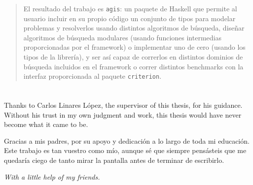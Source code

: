 \begin{abstract}
El resultado del trabajo es \texttt{agis}: un paquete de Haskell que permite al
usuario incluir en su propio código un conjunto de tipos para modelar problemas
y resolverlos usando distintos algoritmos de búsqueda, diseñar algoritmos de
búsqueda modulares (usando funciones intermedias proporcionadas por el
framework) o implementar uno de cero (usando los tipos de la librería), y ser
así capaz de correrlos en distintos dominios de búsqueda incluidos en el
framework o correr distintos benchmarks con la interfaz proporcionada al
paquete \texttt{criterion}.\\
\end{abstract}

\vspace*{\fill}
\newpage



\vspace*{4cm}

\section*{}

Thanks to Carlos Linares López, the supervisor of this thesis, for his
guidance. Without his trust in my own judgment and work, this thesis would
have never become what it came to be.\\


Gracias a mis padres, por su apoyo y dedicación a lo largo de toda mi
educación. Este trabajo es tan vuestro como mío, aunque sé que siempre
pensásteis que me quedaría ciego de tanto mirar la pantalla antes de
terminar de escribirlo.\\

\vspace{1cm}


\centerline{\emph{With a little help of my friends.}}

\newpage

